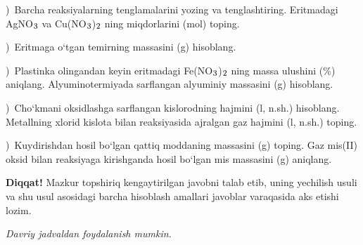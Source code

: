 \documentclass[11pt,a4paper]{article}
\renewcommand{\textsubscript}[1]{\ensuremath{_{\text{\fontsize{8}{8}\selectfont #1}}}}
\newcommand{\qsep}{\par\vspace{13pt}}
\newcommand{\diqqat}[1]{\par\smallskip\noindent\textbf{Diqqat!} #1\par\medskip}
\newcommand{\hdrpill}[1]{\begin{tikzpicture}[baseline=0pt]\node[fill=ygreen,text=white,rounded corners=8pt,inner xsep=10pt,inner ysep=5pt,font=\fontsize{13}{15}\bfseries\selectfont] at (0,0.475){#1};\end{tikzpicture}}
\newcommand{\curvar}{}\fancyhead[R]{\hdrpill{\curvar}}
\begin{document}
)\ Barcha reaksiyalarning tenglamalarini yozing va tenglashtiring. Eritmadagi AgNO\textsubscript{3} va Cu(NO\textsubscript{3})\textsubscript{2} ning miqdorlarini (mol) toping.\par
{})\ Eritmaga o`tgan temirning massasini (g) hisoblang.\par
{})\ Plastinka olingandan keyin eritmadagi Fe(NO\textsubscript{3})\textsubscript{2} ning massa ulushini (\%) aniqlang. Alyuminotermiyada sarflangan alyuminiy massasini (g) hisoblang.\par
{})\ Cho`kmani oksidlashga sarflangan kislorodning hajmini (l, n.sh.) hisoblang. Metallning xlorid kislota bilan reaksiyasida ajralgan gaz hajmini (l, n.sh.) toping.\par
{})\ Kuydirishdan hosil bo`lgan qattiq moddaning massasini (g) toping. Gaz mis(II) oksid bilan reaksiyaga kirishganda hosil bo`lgan mis massasini (g) aniqlang.\par
\diqqat{Mazkur topshiriq kengaytirilgan javobni talab etib, uning yechilish usuli va shu usul asosidagi barcha hisoblash amallari javoblar varaqasida aks etishi lozim.}\qsep
\newpage
\renewcommand{\curvar}{4-variant}
\thispagestyle{first}
\noindent\textit{Davriy jadvaldan foydalanish mumkin.}
\par\smallskip
\end{document}
